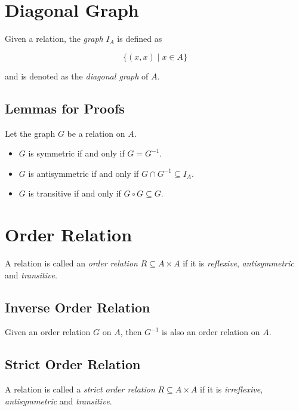 \section{Diagonal Graph}

Given a relation, the \emph{graph} \(I_A\) is defined as

\[
	\{(x, x) \mid x \in A\}
\]

and is denoted as the \emph{diagonal graph} of \(A\).

\subsection{Lemmas for Proofs}

Let the graph \(G\) be a relation on \(A\).

\begin{itemize}

	\item \(G\) is symmetric if and only if \(G = G^{-1}\).

	\item \(G\) is antisymmetric if and only if \(G \cap G^{-1} \subseteq I_A\).

	\item \(G\) is transitive if and only if \(G \circ G \subseteq G\).

\end{itemize}

\section{Order Relation}

A relation is called an \emph{order relation} \(R \subseteq A \times A\) if it is \emph{reflexive}, \emph{antisymmetric} and \emph{transitive}.

\subsection{Inverse Order Relation}

Given an order relation \(G\) on \(A\), then \(G^{-1}\) is also an order relation on \(A\).

\subsection{Strict Order Relation}

A relation is called a \emph{strict order relation} \(R \subseteq A \times A\) if it is \emph{irreflexive}, \emph{antisymmetric} and \emph{transitive}.

